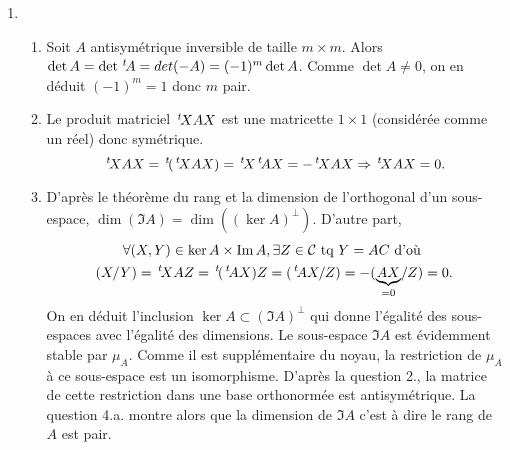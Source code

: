 \begin{enumerate}
 \item
\begin{enumerate}
 \item Soit $A$ antisymétrique inversible de taille $m\times m$. Alors $\det A = \det \,\mathstrut^t\!{A} = det(-A) = (-1)^m \det A$. Comme $\det A \neq 0$, on en déduit $(-1)^m=1$ donc $m$ pair.
 
 \item Le produit matriciel $\,\mathstrut^t\!{X} A X$ est une matricette $1 \times 1$ (considérée comme un réel) donc symétrique.
\[
 \,\mathstrut^t\!{X} A X = \,\mathstrut^t\!{(\,\mathstrut^t\!{X} A X)} = \,\mathstrut^t\!{X} \,\mathstrut^t\!{A} X = - \,\mathstrut^t\!{X} A X \Rightarrow \,\mathstrut^t\!{X} A X = 0.
\]

 \item D'après le théorème du rang et la dimension de l'orthogonal d'un sous-espace, $\dim (\Im A) = \dim ((\ker A)^\bot)$. D'autre part,
\begin{multline*}
\forall (X,Y)\in \ker A \times \operatorname{Im} A, \exists Z\in \mathcal{C} \text{ tq } Y = AC \text{ d'où } \\
(X/Y) = \,\mathstrut^t\!{X} AZ 
= \,\mathstrut^t\!{(\,\mathstrut^t\!{A}X)}Z = (\,\mathstrut^t\!{A}X/ Z) = -(\underset{=0}{\underbrace{AX}} / Z) = 0. 
\end{multline*}
On en déduit l'inclusion $\ker A \subset (\Im A)^\bot$ qui donne l'égalité des sous-espaces avec l'égalité des dimensions.\newline
Le sous-espace $\Im A$ est évidemment stable par $\mu_A$. Comme il est supplémentaire du noyau, la restriction de $\mu_A$ à ce sous-espace est un isomorphisme. D'après la question 2., la matrice de cette restriction dans une base orthonormée est antisymétrique. La question 4.a. montre alors que la dimension de $\Im A$ c'est à dire le rang de $A$ est pair.
\end{enumerate}

\end{enumerate}

